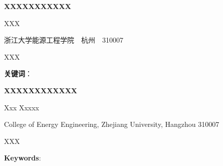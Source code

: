 \cleardoublepage{}
\fancyhead{}
\renewcommand{\headrulewidth}{0pt}
\begin{center}
    \bfseries {} XXXXXXXXXXX
\end{center}

\begin{center}
    XXX

    浙江大学能源工程学院~~杭州~~310007
\end{center}


XXX

\vspace{1cm}

\textbf{关键词}：

\cleardoublepage{}
\fancyhead{}
\renewcommand{\headrulewidth}{0pt}
\begin{center}
    \bfseries {} XXXXXXXXXXXX
\end{center}

\begin{center}
    Xxx Xxxxx

    College of Energy Engineering, Zhejiang University, Hangzhou 310007
\end{center}


XXX

\vspace{1cm}

\textbf{Keywords}: 
